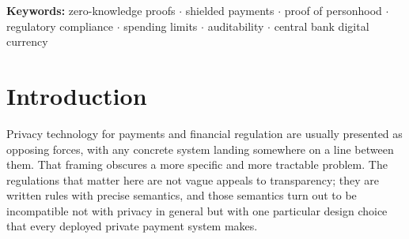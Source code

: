 \documentclass[11pt,a4paper]{article}
\theoremstyle{definition}
\theoremstyle{plain}
\theoremstyle{remark}
\begin{document}
\begin{abstract}
We specify the credential layer end to end, from optical capture of the machine-readable zone and PACE chip access through in-circuit verification of the ICAO Passive Authentication chain to derivation of the person secret, and we identify a leak that a naive deployment of that chain introduces: because signature algorithms correlate with issuing states, selecting a verification circuit by algorithm publishes an approximation of the holder's nationality. We close it by witnessing the verification key under a membership proof, so enrollment presents one interface for every holder. We give game-based definitions for person-binding, limit soundness, unlinkability, and disclosure correctness, together with proof sketches, and report a working implementation in Noir over BN254 with a Grumpkin-embedded encryption gadget. The spend circuit is 8{,}094 UltraHonk gates and proves in 110\,ms with 2.7\,ms verification on commodity hardware. Proving cost below and above the disclosure threshold is measured at 110.1\,ms and 110.2\,ms respectively, so the uniformity on which the privacy argument depends is observable rather than assumed; costs for the passport circuits are projected from published figures for deployed systems on the same proving stack and are labelled as such throughout. We are explicit about what is not solved, including multiple citizenship, replacement documents, borrowed documents, and populations without passports at all.
\end{abstract}

\noindent\textbf{Keywords:} zero-knowledge proofs $\cdot$ shielded payments $\cdot$ proof of personhood $\cdot$ regulatory compliance $\cdot$ spending limits $\cdot$ auditability $\cdot$ central bank digital currency

\medskip

\section{Introduction}
\label{sec:intro}

Privacy technology for payments and financial regulation are usually presented as opposing forces, with any concrete system landing somewhere on a line between them. That framing obscures a more specific and more tractable problem. The regulations that matter here are not vague appeals to transparency; they are written rules with precise semantics, and those semantics turn out to be incompatible not with privacy in general but with one particular design choice that every deployed private payment system makes.
\end{document}
